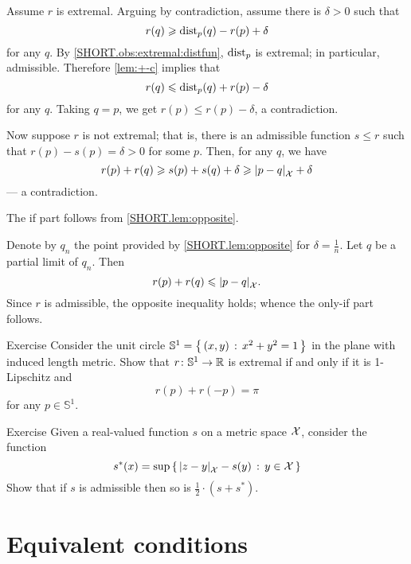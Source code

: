 Assume $r$ is extremal.
Arguing by contradiction, assume there is $\delta>0$ such that
\[r(q)\geqslant \mathrm{dist}_p(q)-r(p)+\delta\]
for any $q$.
By \ref{SHORT.obs:extremal:distfun}, $\mathrm{dist}_p$ is extremal; in particular, admissible.
Therefore \ref{lem:+-c} implies that
\[r(q)\leqslant \mathrm{dist}_p(q)+r(p)-\delta\]
for any $q$.
Taking $q=p$, we get $r(p)\le r(p)-\delta$, a contradiction.

Now suppose $r$ is not extremal; that is, there is an admissible function $s\le r$ such that $r(p)-s(p)=\delta>0$ for some $p$.
Then, for any $q$, we have
\[r(p)+r(q)\ge s(p)+s(q)+\delta\ge \dist{p}{q}{\spc{X}}+\delta\]
--- a contradiction.

The if part follows from \ref{SHORT.lem:opposite}.

Denote by $q_n$ the point provided by \ref{SHORT.lem:opposite} for $\delta=\tfrac1n$.
Let $q$ be a partial limit of $q_n$. 
Then 
\[r(p)+r(q)\le\dist{p}{q}{\spc{X}}.\]
Since $r$ is admissible, the opposite inequality holds;
whence the only-if part follows.
\qeds

\begin{thm}{Exercise}\label{ex:circle}
Consider the unit circle $\mathbb{S}^1=\left\{\,{(x,y)}\,:\,{x^2+y^2=1}\,\right\}$ in the plane with induced length metric.
Show that $r\colon\mathbb{S}^1\to\mathbb{R}$ is extremal if and only if it is 1-Lipschitz and 
\[r(p)+r(-p)=\pi\] for any $p\in\mathbb{S}^1$.
\end{thm}

\begin{thm}{Exercise}\label{ex:retraction}
Given a real-valued function $s$ on a metric space $\mathcal{X}$,
consider the function
\[s^*(x)=\sup\set{\dist{z}{y}{\spc{X}}-s(y)}{y\in \spc{X}}\]
Show that if $s$ is admissible then so is $\tfrac12\cdot(s+s^*)$.
\end{thm}

\section{Equivalent conditions}

